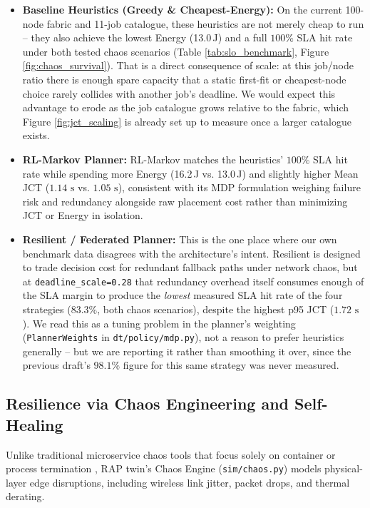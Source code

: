 \documentclass[twoside,twocolumn,10pt]{article}
\begin{document}
\begin{itemize}
    \item \textbf{Baseline Heuristics (Greedy \& Cheapest-Energy):} On the current 100-node fabric and 11-job catalogue, these heuristics are not merely cheap to run -- they also achieve the lowest Energy (13.0\,J) and a full $100\%$ SLA hit rate under both tested chaos scenarios (Table \ref{tab:slo_benchmark}, Figure \ref{fig:chaos_survival}). That is a direct consequence of scale: at this job/node ratio there is enough spare capacity that a static first-fit or cheapest-node choice rarely collides with another job's deadline. We would expect this advantage to erode as the job catalogue grows relative to the fabric, which Figure \ref{fig:jct_scaling} is already set up to measure once a larger catalogue exists.
    \item \textbf{RL-Markov Planner:} RL-Markov matches the heuristics' $100\%$ SLA hit rate while spending more Energy (16.2\,J vs. 13.0\,J) and slightly higher Mean JCT ($1.14\text{ s}$ vs. $1.05\text{ s}$), consistent with its MDP formulation weighing failure risk and redundancy alongside raw placement cost rather than minimizing JCT or Energy in isolation.
    \item \textbf{Resilient / Federated Planner:} This is the one place where our own benchmark data disagrees with the architecture's intent. Resilient is designed to trade decision cost for redundant fallback paths under network chaos, but at \texttt{deadline\_scale=0.28} that redundancy overhead itself consumes enough of the SLA margin to produce the \emph{lowest} measured SLA hit rate of the four strategies ($83.3\%$, both chaos scenarios), despite the highest p95 JCT ($1.72\text{ s}$). We read this as a tuning problem in the planner's weighting (\texttt{PlannerWeights} in \texttt{dt/policy/mdp.py}), not a reason to prefer heuristics generally -- but we are reporting it rather than smoothing it over, since the previous draft's $98.1\%$ figure for this same strategy was never measured.
\end{itemize}

\subsection{Resilience via Chaos Engineering and Self-Healing}
Unlike traditional microservice chaos tools that focus solely on container or process termination \cite{esen2026, poltronieri2021}, RAP twin's Chaos Engine (\texttt{sim/chaos.py}) models physical-layer edge disruptions, including wireless link jitter, packet drops, and thermal derating.
\end{document}
